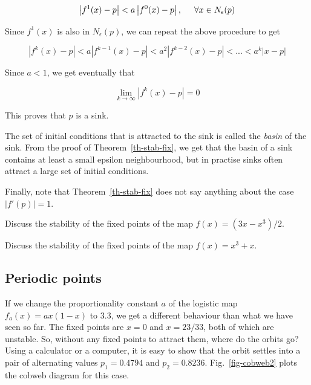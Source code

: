 \begin{equation}
\left|f^1(x)-p\right| < a \left|f^0(x)-p\right|,  \hspace{.5cm} \forall x \in N_\epsilon(p)
\end{equation} 

Since $f^1(x)$ is also in $N_\epsilon(p)$, we can repeat the above procedure to get

\begin{equation}
\left|f^k(x)-p\right| < a\left|f^{k-1}(x)-p\right| < a^2\left|f^{k-2}(x)-p\right|< ... < a^k |x-p| 
\end{equation}  

Since $a<1$, we get eventually that

\begin{equation}
\lim_{k \to \infty} \left|f^k(x)-p\right| = 0
\end{equation} 

This proves that $p$ is a sink.

The set of initial conditions that is attracted to the sink is called the \emph{basin} of the sink. From the proof of Theorem~\ref{th-stab-fix}, we get that the basin of a sink contains at least a small epsilon neighbourhood, but in practise sinks often attract a large set of initial conditions.

Finally, note that Theorem~\ref{th-stab-fix} does not say anything about the case $|f'(p)|=1$.

\begin{sidebar}
\begin{ex}
Discuss the stability of the fixed points of the map $f(x) = (3x-x^3)/2$.
\end{ex}
\end{sidebar}

\begin{sidebar}
\begin{ex}
Discuss the stability of the fixed points of the map $f(x) = x^3 + x$.
\end{ex}
\end{sidebar}

\subsection{Periodic points}

If we change the proportionality constant $a$ of the logistic map $f_a(x)=ax(1-x)$ to 3.3, we get a different behaviour than what we have seen so far. The fixed points are $x=0$ and $x=23/33$, both of which are unstable. So, without any fixed points to attract them, where do the orbits go? Using a calculator or a computer, it is easy to show that the orbit settles into a pair of alternating values $p_1=0.4794$ and $p_2=0.8236$. Fig.~\ref{fig-cobweb2} plots the cobweb diagram for this case.

